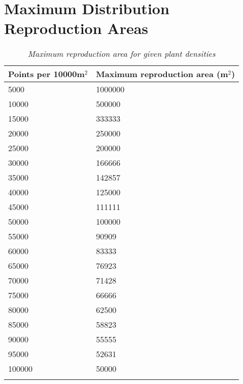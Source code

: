 \chapter{Maximum Distribution Reproduction Areas} \label{AppendixC}

\begin{longtable}{|p{7cm}|p{8cm}|}
		\hline
		\textbf{Points per 10000m$^{2}$} & \textbf{Maximum reproduction area (m$^{2}$)}\\
		\hline
		5000	  &  1000000\\
		\hline
		10000	  &  500000\\
		\hline
		15000 &	333333\\
		\hline
		20000 &	250000\\
		\hline
		25000 &	200000\\
		\hline
		30000 &	166666\\
		\hline
		35000 &	142857\\
		\hline
		40000 &	125000\\
		\hline
		45000 &	111111\\
		\hline
		50000 &	100000\\
		\hline
		55000 &	90909\\
		\hline
		60000 &	83333\\
		\hline
		65000 &	76923\\
		\hline
		70000 &	71428\\
		\hline
		75000 &	66666\\
		\hline
		80000 &	62500\\
		\hline
		85000 &	58823\\
		\hline
		90000 &	55555\\
		\hline
		95000 &	52631\\
		\hline
		100000 & 50000\\
		\hline
		\caption{\textit{Maximum reproduction area for given plant densities}}
	  \label{tab:maximum_reproduction_areas}
\end{longtable}